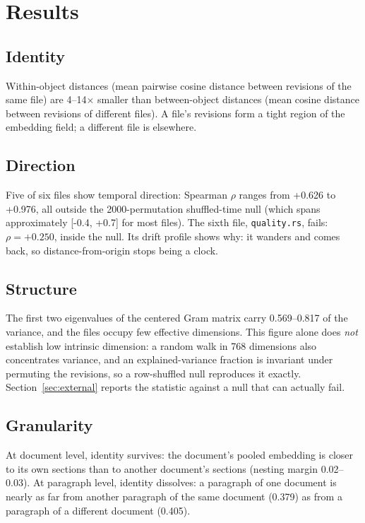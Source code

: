 \documentclass[11pt]{article}
\begin{document}
\section{Results}

\subsection{Identity}

Within-object distances (mean pairwise cosine distance between revisions
of the same file) are 4--14$\times$ smaller than between-object distances
(mean cosine distance between revisions of different files). A file's
revisions form a tight region of the embedding field; a different file is
elsewhere.

\subsection{Direction}

Five of six files show temporal direction: Spearman $\rho$ ranges from
+0.626 to +0.976, all outside the 2000-permutation shuffled-time null
(which spans approximately [-0.4, +0.7] for most files). The sixth file,
\texttt{quality.rs}, fails: $\rho = +0.250$, inside the null. Its drift
profile shows why: it wanders and comes back, so distance-from-origin
stops being a clock.

\subsection{Structure}

The first two eigenvalues of the centered Gram matrix carry 0.569--0.817
of the variance, and the files occupy few effective dimensions. This figure
alone does \emph{not} establish low intrinsic dimension: a random walk in
768 dimensions also concentrates variance, and an explained-variance fraction
is invariant under permuting the revisions, so a row-shuffled null reproduces
it exactly. Section~\ref{sec:external} reports the statistic against a null
that can actually fail.

\subsection{Granularity}

At document level, identity survives: the document's pooled embedding is
closer to its own sections than to another document's sections (nesting
margin 0.02--0.03). At paragraph level, identity dissolves: a paragraph of
one document is nearly as far from another paragraph of the same document
(0.379) as from a paragraph of a different document (0.405).
\end{document}
